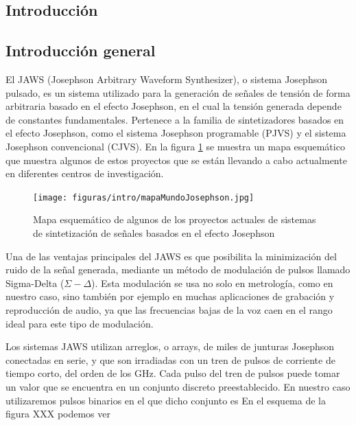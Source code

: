 \documentclass[twoside]{article}
\begin{document}
\begin{multicols}{2}

\section{Introducción}

\subsection{Introducción general} %

El JAWS (Josephson Arbitrary Waveform Synthesizer), o sistema Josephson pulsado, es un sistema utilizado para la generación de señales de tensión de forma arbitraria basado en el efecto Josephson, en el cual la tensión generada depende de constantes fundamentales. Pertenece a la familia de sintetizadores basados en el efecto Josephson, como el sistema Josephson programable (PJVS) y el sistema Josephson convencional (CJVS). En la figura \ref{fig:intro_mapaMundoJosephson} se muestra un mapa esquemático que muestra algunos de estos proyectos que se están llevando a cabo actualmente en diferentes centros de investigación.
\begin{figure}[H]
    \centering
    \texttt{[image: figuras/intro/mapaMundoJosephson.jpg]}
    \caption{Mapa esquemático de algunos de los proyectos actuales de sistemas de sintetización de señales basados en el efecto Josephson}
    \label{fig:intro_mapaMundoJosephson}
\end{figure}

Una de las ventajas principales del JAWS es que posibilita la minimización del ruido de la señal generada, mediante un método de modulación de pulsos llamado Sigma-Delta ($\Sigma-\Delta$). Esta modulación se usa no solo en metrología, como en nuestro caso, sino también por ejemplo en muchas aplicaciones de grabación y reproducción de audio, ya que las frecuencias bajas de la voz caen en el rango ideal para este tipo de modulación. \cite{SigmaDeltaMT022}

Los sistemas JAWS utilizan arreglos, o arrays, de miles de junturas Josephson conectadas en serie, y que son irradiadas con un tren de pulsos de corriente de tiempo corto, del orden de los $\si{\giga\hertz}$. Cada pulso del tren de pulsos puede tomar un valor que se encuentra en un conjunto discreto preestablecido. En nuestro caso utilizaremos pulsos binarios en el que dicho conjunto es  En el esquema de la figura XXX podemos ver 


\end{multicols}
\end{document}
